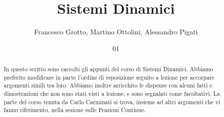 \documentclass[italian,course]{Notes}
\title{Sistemi Dinamici}
\author{Francesco Grotto, Martino Ottolini, Alessandro Pigati}
\date{01}{10}{2014}
\begin{document}
\newpage

\begin{abstract}
 In questo scritto sono raccolti gli appunti del corso di Sistemi Dinamici. 
 Abbiamo preferito modificare in parte l'ordine di esposizione seguito a lezione per accorpare argomenti simili tra loro. 
 Abbiamo inoltre arricchito le dispense con alcuni fatti e dimostrazioni che non sono stati visti a lezione, e sono segnalati come facoltativi. 
 La parte del corso tenuta da Carlo Carminati si trova, insieme ad altri argomenti che vi fanno riferimento, nella sezione sulle Frazioni Continue.
\end{abstract}








\end{document}
